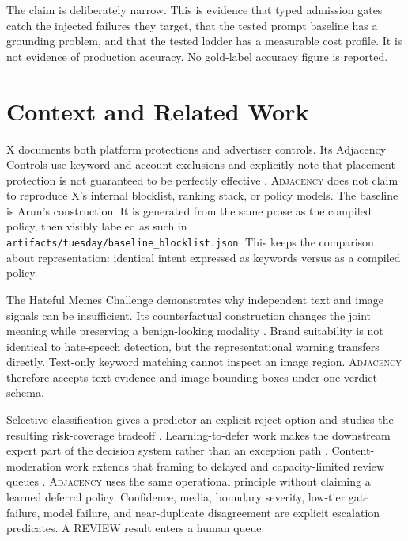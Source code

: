 \documentclass{article}
\newcommand{\artifact}[1]{\nolinkurl{#1}}
\newcommand{\Adj}{\textsc{Adjacency}\xspace}
\begin{document}
The claim is deliberately narrow. This is evidence that typed admission gates catch the injected
failures they target, that the tested prompt baseline has a grounding problem, and that the tested
ladder has a measurable cost profile. It is not evidence of production accuracy. No gold-label
accuracy figure is reported.

\section{Context and Related Work}
\label{sec:related}

 X documents both platform protections and advertiser controls. Its
Adjacency Controls use keyword and account exclusions and explicitly note that placement protection
is not guaranteed to be perfectly effective \citep{xbrandsafety}. \Adj does not claim to reproduce
X's internal blocklist, ranking stack, or policy models. The baseline is Arun's construction. It is
generated from the same prose as the compiled policy, then visibly labeled as such in
\artifact{artifacts/tuesday/baseline_blocklist.json}. This keeps the comparison about representation:
identical intent expressed as keywords versus as a compiled policy.

 The Hateful Memes Challenge demonstrates why independent text and image
signals can be insufficient. Its counterfactual construction changes the joint meaning while
preserving a benign-looking modality \citep{kiela2020hateful}. Brand suitability is not identical to
hate-speech detection, but the representational warning transfers directly. Text-only keyword
matching cannot inspect an image region. \Adj therefore accepts text evidence and image bounding
boxes under one verdict schema.

 Selective classification gives a predictor an
explicit reject option and studies the resulting risk-coverage tradeoff
\citep{geifman2019selectivenet}. Learning-to-defer work makes the downstream expert part of the
decision system rather than an exception path \citep{mozannar2020defer}. Content-moderation work
extends that framing to delayed and capacity-limited review queues \citep{lykouris2024moderation}.
\Adj uses the same operational principle without claiming a learned deferral policy. Confidence,
media, boundary severity, low-tier gate failure, model failure, and near-duplicate disagreement are
explicit escalation predicates. A REVIEW result enters a human queue.
\end{document}
